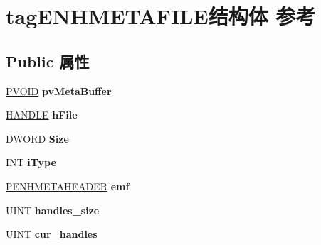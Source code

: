 \hypertarget{structtag_e_n_h_m_e_t_a_f_i_l_e}{}\section{tag\+E\+N\+H\+M\+E\+T\+A\+F\+I\+L\+E结构体 参考}
\label{structtag_e_n_h_m_e_t_a_f_i_l_e}
\subsection*{Public 属性}
\begin{DoxyCompactItemize}
\item 
\mbox{\label{structtag_e_n_h_m_e_t_a_f_i_l_e_a80a141fe5680ba50633885d2ab9f3218}} 
\hyperlink{interfacevoid}{P\+V\+O\+ID} {\bfseries pv\+Meta\+Buffer}
\item 
\mbox{\label{structtag_e_n_h_m_e_t_a_f_i_l_e_a9c42063f649509e15f85cc9e95060e23}} 
\hyperlink{interfacevoid}{H\+A\+N\+D\+LE} {\bfseries h\+File}
\item 
\mbox{\label{structtag_e_n_h_m_e_t_a_f_i_l_e_af0f36636583bed266b3e12208857c200}} 
D\+W\+O\+RD {\bfseries Size}
\item 
\mbox{\label{structtag_e_n_h_m_e_t_a_f_i_l_e_a1f995bdc266663e280bff93660a37d0e}} 
I\+NT {\bfseries i\+Type}
\item 
\mbox{\label{structtag_e_n_h_m_e_t_a_f_i_l_e_aa3fd32213b721a00d82fdf02d1e9dcf9}} 
\hyperlink{structtag_e_n_h_m_e_t_a_h_e_a_d_e_r}{P\+E\+N\+H\+M\+E\+T\+A\+H\+E\+A\+D\+ER} {\bfseries emf}
\item 
\mbox{\label{structtag_e_n_h_m_e_t_a_f_i_l_e_a16a9b5977014e07b0d3049c2154c7b35}} 
U\+I\+NT {\bfseries handles\+\_\+size}
\item 
\mbox{\label{structtag_e_n_h_m_e_t_a_f_i_l_e_afeaca529d01e4fa4bcbea965f71d8bac}} 
U\+I\+NT {\bfseries cur\+\_\+handles}
\item 
\mbox{\label{structtag_e_n_h_m_e_t_a_f_i_l_e_a0f17d129f747eff67f30938e40352a79}} 

\end{DoxyCompactItemize}
